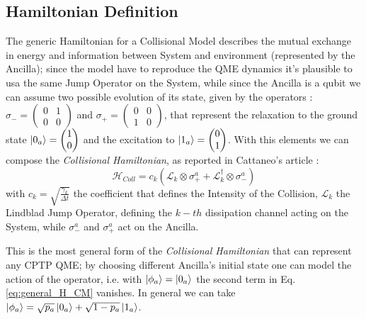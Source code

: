 \documentclass[a4paper,12pt]{article}
\begin{document}
\subsection{Hamiltonian Definition}
The generic Hamiltonian for a Collisional Model describes the mutual exchange in energy and information between System and environment (represented by the Ancilla); since the model have to reproduce the QME dynamics it's plausible to usa the same Jump Operator on the System, while since the Ancilla is a qubit we can assume two possible evolution of its state, given by the operators : $ \sigma_{-} = \begin{pmatrix} 0 & 1 \\ 0 & 0 \end{pmatrix} $ and $ \sigma_{+} = \begin{pmatrix} 0 & 0 \\ 1 & 0 \end{pmatrix} $, that represent the relaxation to the ground state $ \ket{0_{a}} = \begin{pmatrix} 1 \\ 0 \end{pmatrix} $ and the excitation to $ \ket{1_{a}} = \begin{pmatrix} 0 \\ 1 \end{pmatrix} $. \newline
With this elements we can compose the \textit{Collisional Hamiltonian}, as reported in Cattaneo's article\cite{cattaneoCollisionModelsCan2021} : 
\begin{equation}
	\mathcal{H}_{Coll} = c_{k} \left(\mathcal{L}_{k} \otimes \sigma_{+}^{a} + \mathcal{L}_{k}^{\dagger} \otimes \sigma_{-}^{a} \right)
	\label{eq:general_H_CM}
\end{equation}
with $ c_{k} = \sqrt{\frac{\gamma_{k}}{\Delta t}} $ the coefficient that defines the Intensity of the Collision, $ \mathcal{L}_{k} $ the Lindblad Jump Operator, defining the $ k-th $ dissipation channel acting on the System, while $ \sigma_{-}^{a} $ and $ \sigma_{+}^{a} $ act on the Ancilla. 

This is the most general form of the \textit{Collisional Hamiltonian} that can represent any CPTP QME; by choosing different Ancilla's initial state one can model the action of the operator, i.e. with $ \ket{\phi_{a}} = \ket{0_{a}} $ the second term in Eq.\ref{eq:general_H_CM} vanishes. \newline
In general we can take $ \ket{\phi_{a}} = \sqrt{p_{a}} \ket{0_{a}} + \sqrt{1 - p_{a }} \ket{1_{a}} $.
\end{document}
